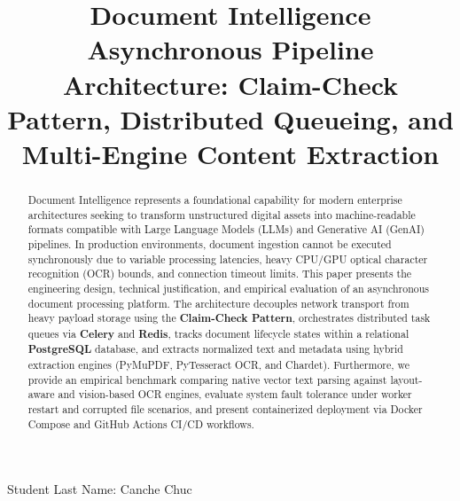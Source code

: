 \documentclass[peerreviewca]{IEEEtran}
\begin{document}
\title{Document Intelligence Asynchronous Pipeline Architecture: Claim-Check Pattern, Distributed Queueing, and Multi-Engine Content Extraction}

\author{
  \and
  }

%
{Student Last Name: Canche Chuc}


\maketitle

\begin{abstract}
Document Intelligence represents a foundational capability for modern enterprise architectures seeking to transform unstructured digital assets into machine-readable formats compatible with Large Language Models (LLMs) and Generative AI (GenAI) pipelines. In production environments, document ingestion cannot be executed synchronously due to variable processing latencies, heavy CPU/GPU optical character recognition (OCR) bounds, and connection timeout limits. This paper presents the engineering design, technical justification, and empirical evaluation of an asynchronous document processing platform. The architecture decouples network transport from heavy payload storage using the \textbf{Claim-Check Pattern}, orchestrates distributed task queues via \textbf{Celery} and \textbf{Redis}, tracks document lifecycle states within a relational \textbf{PostgreSQL} database, and extracts normalized text and metadata using hybrid extraction engines (PyMuPDF, PyTesseract OCR, and Chardet). Furthermore, we provide an empirical benchmark comparing native vector text parsing against layout-aware and vision-based OCR engines, evaluate system fault tolerance under worker restart and corrupted file scenarios, and present containerized deployment via Docker Compose and GitHub Actions CI/CD workflows.
\end{abstract}
\end{document}
